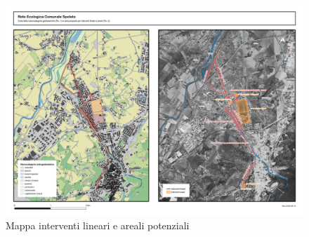 \documentclass[
]{book}
\begin{document}
\begin{figure}

{\centering \includegraphics[width=\linewidth]{./figs/agendaUrbana/tavolaAgendaUrbana20240813} 

}

\caption{Mappa interventi lineari e areali potenziali}\label{fig:agUintevFocus}
\end{figure}
\end{document}
